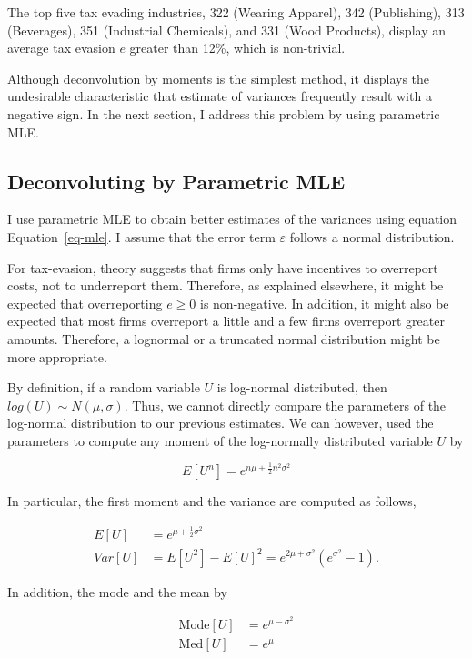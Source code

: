 \documentclass[
  12pt]{article}
\theoremstyle{definition}
\theoremstyle{remark}
\begin{document}
The top five tax evading industries, 322 (Wearing Apparel), 342
(Publishing), 313 (Beverages), 351 (Industrial Chemicals), and 331 (Wood
Products), display an average tax evasion \(e\) greater than 12\%, which
is non-trivial.

Although deconvolution by moments is the simplest method, it displays
the undesirable characteristic that estimate of variances frequently
result with a negative sign. In the next section, I address this problem
by using parametric MLE.

\subsection{Deconvoluting by Parametric
MLE}\label{deconvoluting-by-parametric-mle}

I use parametric MLE to obtain better estimates of the variances using
equation Equation~\ref{eq-mle}. I assume that the error term
\(\varepsilon\) follows a normal distribution.

For tax-evasion, theory suggests that firms only have incentives to
overreport costs, not to underreport them. Therefore, as explained
elsewhere, it might be expected that overreporting \(e\ge0\) is
non-negative. In addition, it might also be expected that most firms
overreport a little and a few firms overreport greater amounts.
Therefore, a lognormal or a truncated normal distribution might be more
appropriate.

By definition, if a random variable \(U\) is log-normal distributed,
then \(log(U)\sim N(\mu, \sigma)\). Thus, we cannot directly compare the
parameters of the log-normal distribution to our previous estimates. We
can however, used the parameters to compute any moment of the
log-normally distributed variable \(U\) by

\[
E[U^n]=e^{n\mu+\frac{1}{2}n^2\sigma^2}
\]

In particular, the first moment and the variance are computed as
follows,

\[
\begin{aligned}  
E[U]&=e^{\mu+\frac{1}{2}\sigma^2}\\
Var[U]&=E[U^2]-E[U]^2=e^{2\mu+\sigma^2}(e^{\sigma^2}-1).
\end{aligned}
\]

In addition, the mode and the mean by

\[
\begin{aligned}
  \text{Mode}[U]&=e^{\mu-\sigma^2} \\
  \text{Med}[U]&=e^{\mu}
\end{aligned}
\]
\end{document}
